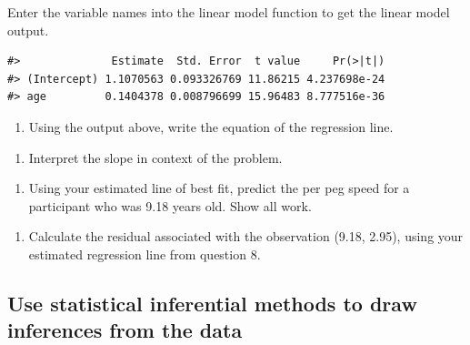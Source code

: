 \documentclass[
]{report}
\providecommand{\tightlist}{%
  \setlength{\itemsep}{0pt}\setlength{\parskip}{0pt}}
\begin{document}
Enter the variable names into the linear model function to get the linear model output.

\begin{verbatim}
#>              Estimate  Std. Error  t value     Pr(>|t|)
#> (Intercept) 1.1070563 0.093326769 11.86215 4.237698e-24
#> age         0.1404378 0.008796699 15.96483 8.777516e-36
\end{verbatim}

\begin{enumerate}
\def\labelenumi{\arabic{enumi}.}
\setcounter{enumi}{7}
\tightlist
\item
  Using the output above, write the equation of the regression line.
\end{enumerate}

\vspace{1in}

\begin{enumerate}
\def\labelenumi{\arabic{enumi}.}
\setcounter{enumi}{8}
\tightlist
\item
  Interpret the slope in context of the problem.
\end{enumerate}

\vspace{1in}

\begin{enumerate}
\def\labelenumi{\arabic{enumi}.}
\setcounter{enumi}{9}
\tightlist
\item
  Using your estimated line of best fit, predict the per peg speed for a participant who was 9.18 years old. Show all work.
\end{enumerate}

\vspace{1in}

\begin{enumerate}
\def\labelenumi{\arabic{enumi}.}
\setcounter{enumi}{10}
\tightlist
\item
  Calculate the residual associated with the observation (9.18, 2.95), using your estimated regression line from question 8.
\end{enumerate}

\vspace{1in}

\hypertarget{use-statistical-inferential-methods-to-draw-inferences-from-the-data}{%
\subsection{Use statistical inferential methods to draw inferences from the data}\label{use-statistical-inferential-methods-to-draw-inferences-from-the-data}}
\end{document}
